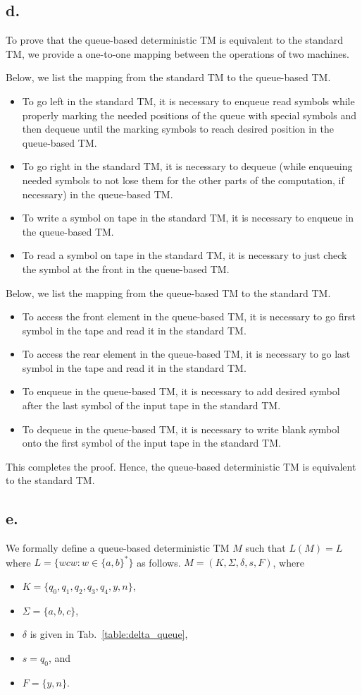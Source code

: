 \documentclass[12pt]{article}
\begin{document}
\subsection*{d.}
To prove that the queue-based deterministic TM is equivalent to the standard TM, we provide a one-to-one mapping between the operations of two machines.

\noindent Below, we list the mapping from the standard TM to the queue-based TM.
\begin{itemize}
	\item To go left in the standard TM, it is necessary to enqueue read symbols while properly marking the needed positions of the queue with special symbols and then dequeue until the marking symbols to reach desired position in the queue-based TM.
	\item To go right in the standard TM, it is necessary to dequeue (while enqueuing needed symbols to not lose them for the other parts of the computation, if necessary) in the queue-based TM.
	\item To write a symbol on tape in the standard TM, it is necessary to enqueue in the queue-based TM.
	\item To read a symbol on tape in the standard TM, it is necessary to just check the symbol at the front  in the queue-based TM. 
\end{itemize}

\noindent Below, we list the mapping from the queue-based TM to the standard TM.
\begin{itemize}
	\item To access the front element in the queue-based TM, it is necessary to go first symbol in the tape and read it in the standard TM.
	\item To access the rear element in the queue-based TM, it is necessary to go last symbol in the tape and read it in the standard TM.
	\item To enqueue in the queue-based TM, it is necessary to add desired symbol after the last symbol of the input tape in the standard TM.
	\item To dequeue in the queue-based TM, it is necessary to write blank symbol onto the first symbol of the input tape in the standard TM.
\end{itemize}

\noindent This completes the proof. Hence, the queue-based deterministic TM is equivalent to the standard TM.
\subsection*{e.}
We formally define a queue-based deterministic TM $M$ such that $L(M) = L$ where $L = \{wcw \colon w \in \{a, b\}^*\}$ as follows. $M = (K, \Sigma, \delta, s, F)$, where
\begin{itemize}
	\item $K = \{q_0, q_1, q_2, q_3, q_4, y, n\}$,
	\item $\Sigma = \{a, b, c\}$,
	\item $\delta$ is given in Tab.~\ref{table:delta_queue},
	\item $s = q_0$, and
	\item $F = \{y, n\}$.
\end{itemize}
\end{document}

